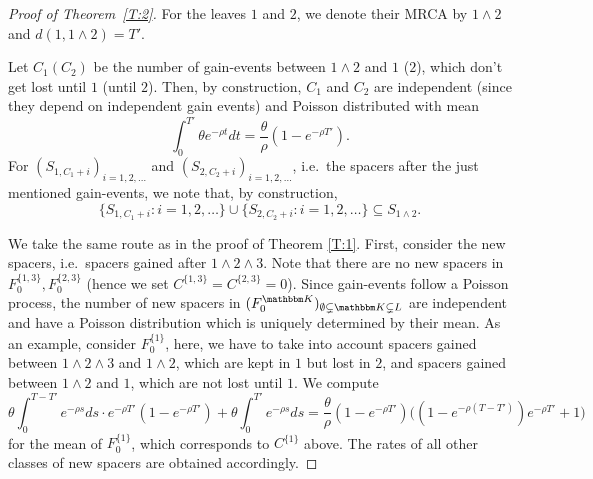\documentclass[preprint,authoryear]{elsarticle}
\theoremstyle{definition}
\numberwithin{equation}{section}
\numberwithin{figure}{section}
\begin{document}
\begin{proof}[Proof of Theorem~\ref{T:2}]


  For the leaves $\mathfrak 1$ and $\mathfrak 2$, we denote their MRCA
  by $\mathfrak 1\wedge\mathfrak 2$ and $d(\mathfrak 1, \mathfrak 1 \wedge \mathfrak 2) = T'$. 

  
  Let
  $C_{\mathfrak 1} (C_{\mathfrak 2})$ be the number of gain-events
  between $\mathfrak 1\wedge\mathfrak 2$ and $\mathfrak 1$
  ($\mathfrak 2$), which don't get lost until $\mathfrak 1$ (until
  $\mathfrak 2$). Then, by construction, $C_{\mathfrak 1}$ and
  $C_{\mathfrak 2}$ are independent (since they depend on independent
  gain events) and Poisson distributed with mean
  $$ \int_{0}^{T'} \theta  e^{-\rho t}  
  dt = \frac\theta\rho(1-e^{-\rho T'}).$$
  For $(S_{\mathfrak 1, C_{\mathfrak 1} + i})_{i=1,2,\dots}$ and
  $(S_{\mathfrak 2, C_{\mathfrak 2} + i})_{i=1,2,\dots}$, i.e.\ the
  spacers after the just mentioned gain-events, we note that, by
  construction,
  $$ \{S_{\mathfrak 1, C_{\mathfrak 1} + i}: i=1,2,\dots\} \cup 
  \{S_{\mathfrak 2, C_{\mathfrak 2} + i}: i=1,2,\dots\} \subseteq
  S_{\mathfrak 1 \wedge\mathfrak 2}.$$


  We take the same route as in the proof of Theorem \ref{T:1}. First,
  consider the new spacers, i.e.\ spacers gained after
  $\mathfrak 1\wedge \mathfrak 2\wedge \mathfrak 3$. Note that there
  are no new spacers in
  $F_0^{\{\mathfrak 1, \mathfrak 3\}}, F_0^{\{\mathfrak 2, \mathfrak
    3\}}$
  (hence we set
  $C^{\{\mathfrak 1, \mathfrak 3\}} = C^{\{\mathfrak 2, \mathfrak
    3\}}=0$).
  Since gain-events follow a Poisson process, the number of new
  spacers in
  $(F_0^{\mathbbm K})_{\emptyset \subsetneq \mathbbm K\subsetneq L}$
  are independent and have a Poisson distribution which
  is uniquely determined by their mean. As an example,
  consider $F_0^{\{\mathfrak 1\}}$, here, we have to take into account
  spacers gained between
  $\mathfrak 1\wedge \mathfrak 2\wedge \mathfrak 3$ and
  $\mathfrak 1\wedge \mathfrak 2$, which are kept in $\mathfrak 1$ but
  lost in $\mathfrak 2$, and spacers gained between
  $\mathfrak 1\wedge \mathfrak 2$ and $\mathfrak 1$, which are not
  lost until $\mathfrak 1$. We compute 
  $$ \theta \int_0^{T-T'} e^{-\rho s}ds \cdot e^{-\rho T'}(1-e^{-\rho T'}) +  \theta \int_0^{T'}
  e^{-\rho s}ds = \frac\theta\rho (1-e^{-\rho T'})\big(
  (1 - e^{-\rho (T-T')})e^{-\rho T'} + 1\big)$$
  for the mean of $F_0^{\{\mathfrak 1\}}$, which corresponds to
  $C^{\{\mathfrak 1\}}$ above. The rates of all other
  classes of new spacers are obtained accordingly.



\end{proof}
\end{document}
